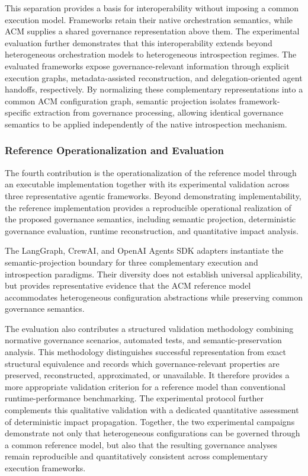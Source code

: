 \documentclass[10pt]{article}
\begin{document}
This separation provides a basis for interoperability without imposing a common execution model. Frameworks retain their native orchestration semantics, while ACM supplies a shared governance representation above them.
The experimental evaluation further demonstrates that this interoperability extends beyond heterogeneous orchestration models to heterogeneous introspection regimes. The evaluated frameworks expose governance-relevant information through explicit execution graphs, metadata-assisted reconstruction, and delegation-oriented agent handoffs, respectively. By normalizing these complementary representations into a common ACM configuration graph, semantic projection isolates framework-specific extraction from governance processing, allowing identical governance semantics to be applied independently of the native introspection mechanism.

\subsubsection{Reference Operationalization and Evaluation}

The fourth contribution is the operationalization of the reference model through an executable implementation together with its experimental validation across three representative agentic frameworks. Beyond demonstrating implementability, the reference implementation provides a reproducible operational realization of the proposed governance semantics, including semantic projection, deterministic governance evaluation, runtime reconstruction, and quantitative impact analysis.

The LangGraph, CrewAI, and OpenAI Agents SDK adapters instantiate the semantic-projection boundary for three complementary execution and introspection paradigms. Their diversity does not establish universal applicability, but provides representative evidence that the ACM reference model accommodates heterogeneous configuration abstractions while preserving common governance semantics. 

The evaluation also contributes a structured validation methodology combining normative governance scenarios, automated tests, and semantic-preservation analysis. This methodology distinguishes successful representation from exact structural equivalence and records which governance-relevant properties are preserved, reconstructed, approximated, or unavailable. It therefore provides a more appropriate validation criterion for a reference model than conventional runtime-performance benchmarking. The experimental protocol further complements this qualitative validation with a dedicated quantitative assessment of deterministic impact propagation. Together, the two experimental campaigns demonstrate not only that heterogeneous configurations can be governed through a common reference model, but also that the resulting governance analyses remain reproducible and quantitatively consistent across complementary execution frameworks.
\end{document}
